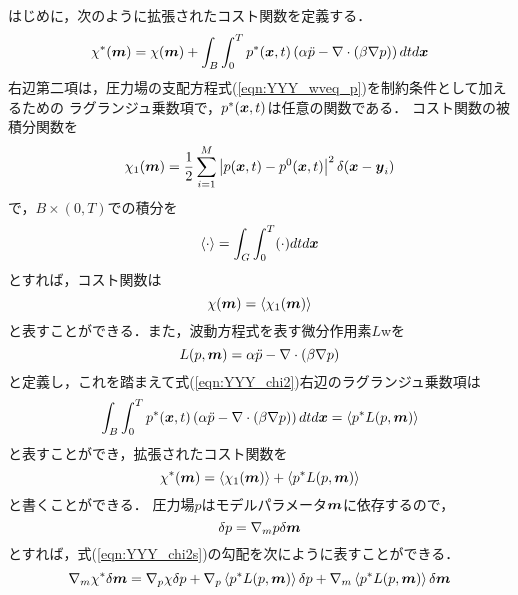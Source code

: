 はじめに，次のように拡張されたコスト関数を定義する．
\begin{equation}
	\chi^*(\mbox{\boldmath $m$})
	=
	\chi(\mbox{\boldmath $m$})
	+
	\int_B\int_0^T 
	p^*(\mbox{\boldmath $x$},t)
	\left( 
		\alpha \ddot{p}-\nabla \cdot \left(\beta  \nabla  p \right)
	\right)
	dt d\mbox{\boldmath $x$}
	\label{eqn:YYY_chi2}
\end{equation}
右辺第二項は，圧力場の支配方程式(\ref{eqn:YYY_wveq_p})を制約条件として加えるための
ラグランジュ乗数項で，$p^*(\mbox{\boldmath $x$},t)$は任意の関数である．
コスト関数の被積分関数を
\begin{equation}
	\chi_1(\mbox{\boldmath $m$})=\frac{1}{2} 
	\sum_{i=1}^M
	\left| p(\mbox{\boldmath $x$},t)-p^0(\mbox{\boldmath $x$},t)\right|^2
	\delta(\mbox{\boldmath $x$}-\mbox{\boldmath $y$}_i )
	\label{eqn:YYY_04}
\end{equation}
で，$B\times (0,T)$での積分を
\begin{equation}
	\left< \cdot \right>=\int_G\int_0^T (\cdot )dtd\mbox{\boldmath $x$}
	\label{eqn:YYY_05}
\end{equation}
とすれば，コスト関数は
\begin{equation}
	\chi (\mbox{\boldmath $m$})=\left< \chi_1(\mbox{\boldmath $m$} )\right>
	\label{eqn:}
\end{equation}
と表すことができる．また，波動方程式を表す微分作用素$L$wを
\begin{equation}
	L(p,\mbox{\boldmath $m$})=\alpha \ddot{p}-\nabla \cdot \left(\beta  \nabla  p \right)
	\label{eqn:YYY_06}
\end{equation}
と定義し，これを踏まえて式(\ref{eqn:YYY_chi2})右辺のラグランジュ乗数項は
\begin{equation}
	\int_B\int_0^T 
	p^*(\mbox{\boldmath $x$},t)
	\left( 
		\alpha \ddot{p}-\nabla \cdot \left(\beta  \nabla  p \right)
	\right)
	dt d\mbox{\boldmath $x$}
	=
	\left< p^* L(p,\mbox{\boldmath $m$}) \right>
	\label{eqn:}
\end{equation}
と表すことができ，拡張されたコスト関数を
\begin{equation}
	\chi^*(\mbox{\boldmath $m$}) 
	=
	\left< \chi_1 (\mbox{\boldmath $m$})\right>
	+
	\left< p^* L(p,\mbox{\boldmath $m$})\right>
	\label{eqn:YYY_chi2s}
\end{equation}
と書くことができる．
圧力場$p$はモデルパラメータ$\mbox{\boldmath $m$}$に依存するので，
\begin{equation}
	\delta p= \nabla_m p \delta \mbox{\boldmath $m$}
	\label{eqn:YYY_var_p}
\end{equation}
とすれば，式(\ref{eqn:YYY_chi2s})の勾配を次にように表すことができる．
\begin{equation}
	\nabla_m \chi^* \delta \mbox{\boldmath $m$}
	=
	\nabla_p \chi \delta p
	+
	\nabla_p \left< p^*  L(p,\mbox{\boldmath $m$}) \right> \delta p
	+
	\nabla_m \left< p^*  L(p,\mbox{\boldmath $m$}) \right> \delta \mbox{\boldmath $m$}
	\label{eqn:YYY_dchi2}
\end{equation}
